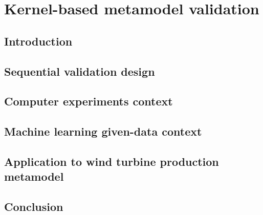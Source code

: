 \chapter{Kernel-based metamodel validation}
    \section{Introduction}
    \section{Sequential validation design}
    \section{Computer experiments context}
    \section{Machine learning given-data context}
    \section{Application to wind turbine production metamodel}
    \section{Conclusion}